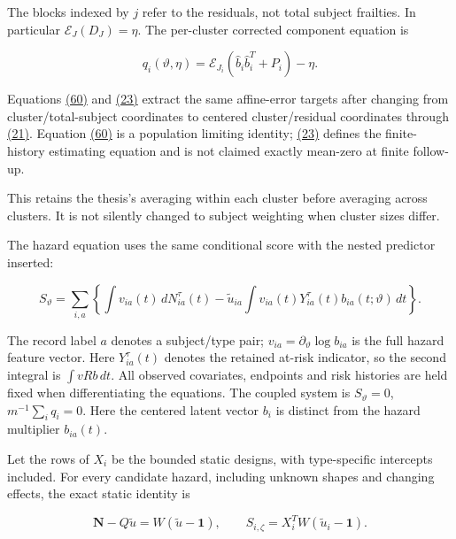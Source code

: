\documentclass[11pt]{article}
\begin{document}
The blocks indexed by \(j\) refer to the residuals, not total subject frailties. In particular \(\mathcal E_J(D_J)=\eta\). The per-cluster corrected component equation is

\begin{equation*}
q_i(\vartheta,\eta)=\mathcal E_{J_i}(\widehat b_i\widehat b_i^T+P_i)-\eta.
\tag{23}\label{eq:23}
\end{equation*}

Equations \hyperref[eq:60]{(60)} and \hyperref[eq:23]{(23)} extract the same affine-error targets after changing from cluster/total-subject coordinates to centered cluster/residual coordinates through \hyperref[eq:21]{(21)}. Equation \hyperref[eq:60]{(60)} is a population limiting identity; \hyperref[eq:23]{(23)} defines the finite-history estimating equation and is not claimed exactly mean-zero at finite follow-up.

This retains the thesis's averaging within each cluster before averaging across clusters. It is not silently changed to subject weighting when cluster sizes differ.

The hazard equation uses the same conditional score with the nested predictor inserted:

\begin{equation*}
S_\vartheta=\sum_{i,a}\left\{\int v_{ia}(t)\,dN_{ia}^{\tau}(t)
-\widetilde u_{ia}\int v_{ia}(t)Y_{ia}^{\tau}(t)b_{ia}(t;\vartheta)\,dt\right\}.
\tag{24}\label{eq:24}
\end{equation*}

The record label \(a\) denotes a subject/type pair; \(v_{ia}=\partial_\vartheta\log b_{ia}\) is the full hazard feature vector. Here \(Y_{ia}^{\tau}(t)\) denotes the retained at-risk indicator, so the second integral is \(\int vRb\,dt\). All observed covariates, endpoints and risk histories are held fixed when differentiating the equations. The coupled system is \(S_\vartheta=0\), \(m^{-1}\sum_iq_i=0\). Here the centered latent vector \(b_i\) is distinct from the hazard multiplier \(b_{ia}(t)\).

Let the rows of \(X_i\) be the bounded static designs, with type-specific intercepts included. For every candidate hazard, including unknown shapes and changing effects, the exact static identity is

\begin{equation*}
\mathbf N-Q\widetilde u=W(\widetilde u-\mathbf1),\qquad
S_{i,\zeta}=X_i^TW(\widetilde u_i-\mathbf1).
\tag{25}\label{eq:25}
\end{equation*}
\end{document}
